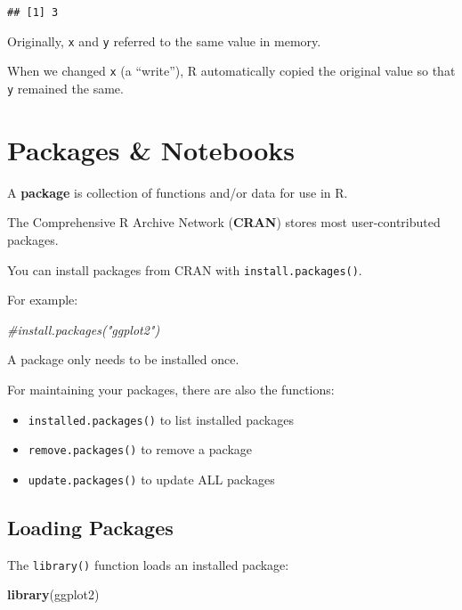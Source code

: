 \documentclass[
]{article}
\newenvironment{Shaded}{\begin{snugshade}}{\end{snugshade}}
\newcommand{\CommentTok}[1]{\textcolor[rgb]{0.56,0.35,0.01}{\textit{#1}}}
\newcommand{\KeywordTok}[1]{\textcolor[rgb]{0.13,0.29,0.53}{\textbf{#1}}}
\newcommand{\NormalTok}[1]{#1}
\providecommand{\tightlist}{%
  \setlength{\itemsep}{0pt}\setlength{\parskip}{0pt}}
\begin{document}
\begin{verbatim}
## [1] 3
\end{verbatim}

Originally, \texttt{x} and \texttt{y} referred to the same value in
memory.

When we changed \texttt{x} (a ``write''), R automatically copied the
original value so that \texttt{y} remained the same.

\hypertarget{packages-notebooks}{%
\section{Packages \& Notebooks}\label{packages-notebooks}}

A \textbf{package} is collection of functions and/or data for use in R.

The Comprehensive R Archive Network (\textbf{CRAN}) stores most
user-contributed packages.

You can install packages from CRAN with \texttt{install.packages()}.

For example:

\begin{Shaded}
\begin{Highlighting}[]
\CommentTok{\#install.packages("ggplot2")}
\end{Highlighting}
\end{Shaded}

A package only needs to be installed once.

For maintaining your packages, there are also the functions:

\begin{itemize}
\tightlist
\item
  \texttt{installed.packages()} to list installed packages
\item
  \texttt{remove.packages()} to remove a package
\item
  \texttt{update.packages()} to update ALL packages
\end{itemize}

\hypertarget{loading-packages}{%
\subsection{Loading Packages}\label{loading-packages}}

The \texttt{library()} function loads an installed package:

\begin{Shaded}
\begin{Highlighting}[]
\KeywordTok{library}\NormalTok{(ggplot2)}
\end{Highlighting}
\end{Shaded}
\end{document}
